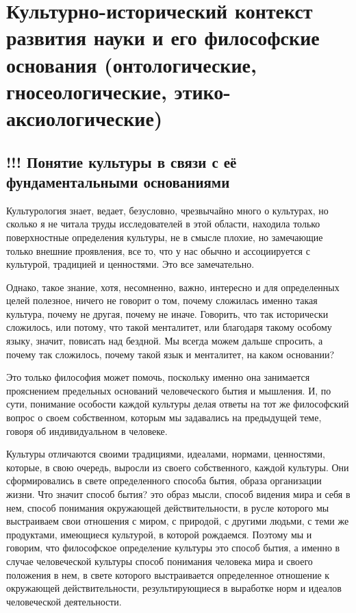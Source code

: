 \section[Культурно-исторический контекст развития науки и его философские основания]{Культурно-исторический контекст развития науки и его философские основания
(онтологические, гносеологические, этико-аксиологические)}

\subsection{!!! Понятие культуры в связи с её фундаментальными основаниями}

Культурология
знает, ведает, безусловно, чрезвычайно много о культурах, но сколько я не читала
труды исследователей в этой области, находила только поверхностные определения
культуры, не в смысле плохие, но замечающие только внешние проявления, все то,
что у нас обычно и ассоциируется с культурой, традицией и ценностями. Это все
замечательно. 

Однако, такое знание, хотя, несомненно, важно, интересно и для
определенных целей полезное, ничего не говорит о том, почему сложилась именно
такая культура, почему не другая, почему не иначе. Говорить, что так исторически
сложилось, или потому, что такой менталитет, или благодаря такому особому языку,
значит, повисать над бездной.
Мы всегда можем дальше спросить, а почему так
сложилось, почему такой язык и менталитет, на каком основании? 

Это только
философия может помочь, поскольку именно она занимается прояснением предельных
оснований человеческого бытия и мышления. И, по сути, понимание особости каждой
культуры делая ответы на тот же философский вопрос о своем собственном, которым
мы задавались на предыдущей теме, говоря об индивидуальном в человеке. 

Культуры отличаются своими традициями, идеалами, нормами, ценностями,
которые, в свою очередь, выросли из своего собственного, каждой культуры. Они
сформировались в свете определенного способа бытия, образа организации жизни.
Что значит способ бытия? это образ мысли, способ видения мира и себя в нем,
способ понимания окружающей действительности, в русле которого мы выстраиваем
свои отношения с миром, с природой, с другими людьми, с теми же продуктами,
имеющиеся культурой, в которой рождаемся. 
Поэтому мы и говорим, что философское
определение культуры это способ бытия, а именно в случае человеческой культуры
способ понимания человека мира и своего положения в нем, в свете которого
выстраивается определенное отношение к окружающей действительности,
результирующиеся в выработке норм и идеалов человеческой деятельности. 

